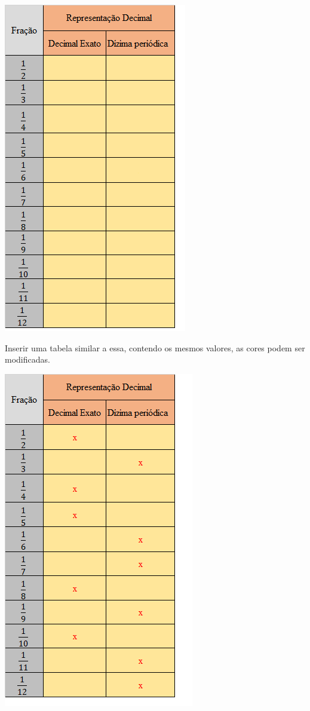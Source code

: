 \includegraphics[width=2\times 37378in,height=4\times 29167in]{./imgSAEB_8_MAT/media/image3.png}

Inserir uma tabela similar a essa, contendo os mesmos valores, as cores
podem ser modificadas.

\includegraphics[width=2\times 14722in,height=3\times 775in]{./imgSAEB_8_MAT/media/image4.png}

